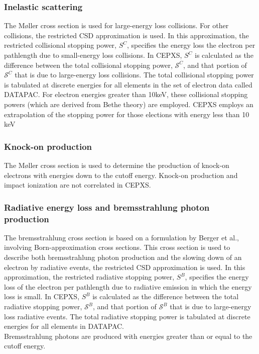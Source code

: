 \subsubsection{Inelastic scattering}
The M\o ller cross section is used for large-energy loss collisions. For other
collisions, the restricted CSD approximation is used. In this approximation,
the restricted collisional stopping power, $S^C$, specifies the energy loss
the electron per pathlength due to small-energy loss collisions. In CEPXS,
$S^C$ is calculated as the difference between the total collisional stopping
power, $\mathcal{S}^C$, and that portion of $\mathcal{S}^C$ that is due to
large-energy loss collisions. The total collisional stopping power is
tabulated at discrete energies for all elements in the set of electron data
called DATAPAC. For electron energies greater than 10keV, these collisional
stopping powers (which are derived from Bethe theory) are employed. CEPXS
employs an extrapolation of the stopping power for those elections with energy
less than 10 keV

\subsubsection{Knock-on production}
The M\o ller cross section is used to determine the production of knock-on
electrons with energies down to the cutoff energy. Knock-on production and
impact ionization are not correlated in CEPXS.

\subsubsection{Radiative energy loss and bremsstrahlung photon production}
The bremsstrahlung cross section is based on a formulation by Berger et al.,
involving Born-approximation cross sections. This
cross section is used to describe both bremsstrahlung photon production and
the slowing down of an electron by radiative events, the restricted CSD
approximation is used. In this approximation, the restricted radiative
stopping power, $S^B$, specifies the energy loss of the electron per
pathlength due to radiative emission in which the energy loss is small. In
CEPXS, $S^B$ is calculated as the difference between the total radiative
stopping power, $\mathcal{S}^B$, and that portion of $\mathcal{S}^B$ that is
due to large-energy loss radiative events. The total radiative stopping power
is tabulated at discrete energies for all elements in DATAPAC.\\
Bremsstrahlung photons are produced with energies greater than or equal to the
cutoff energy. 

